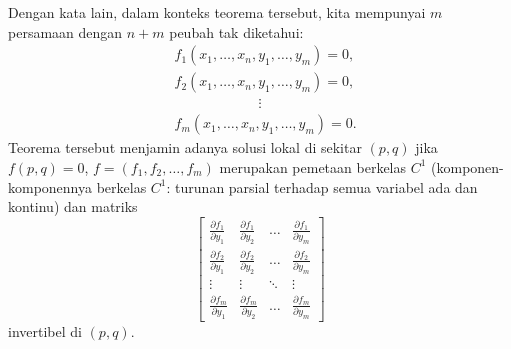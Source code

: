 Dengan kata lain, dalam konteks teorema tersebut, kita mempunyai
$m$ persamaan dengan $n+m$ peubah tak diketahui:
\begin{align*}
& f_1 (x_1,\ldots,x_n,y_1,\ldots,y_m) = 0 , \\
& f_2 (x_1,\ldots,x_n,y_1,\ldots,y_m) = 0 , \\
& \qquad \qquad \qquad  \vdots \\
& f_m (x_1,\ldots,x_n,y_1,\ldots,y_m) = 0 .
\end{align*}
Teorema tersebut menjamin adanya solusi lokal di sekitar $(p,q)$ jika $f(p,q)=0$,
$f=(f_1,f_2,\ldots,f_m)$ merupakan pemetaan berkelas $C^1$
(komponen-komponennya berkelas $C^1$: turunan parsial terhadap semua variabel ada
dan kontinu) dan matriks
\begin{equation*}
\begin{bmatrix}
\frac{\partial f_1}{\partial y_1}
&
\frac{\partial f_1}{\partial y_2}
& \ldots &
\frac{\partial f_1}{\partial y_m}
\\[6pt]
\frac{\partial f_2}{\partial y_1}
&
\frac{\partial f_2}{\partial y_2}
& \ldots &
\frac{\partial f_2}{\partial y_m}
\\
\vdots & \vdots & \ddots & \vdots
\\
\frac{\partial f_m}{\partial y_1}
&
\frac{\partial f_m}{\partial y_2}
& \ldots &
\frac{\partial f_m}{\partial y_m}
\end{bmatrix}
\end{equation*}
invertibel di $(p,q)$.

